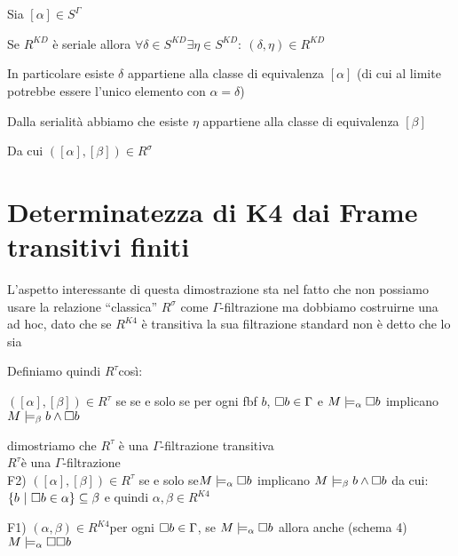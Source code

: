 \\
\\
Sia $[\alpha]\in S^{\Gamma}$

Se $R^{KD}$ è seriale allora $\forall\delta\in S^{KD}\exists\eta\in S^{KD}:\ (\delta,\eta)\in R^{KD}$

In particolare esiste $\delta$ appartiene alla classe di equivalenza
$[\alpha]$ (di cui al limite potrebbe essere l'unico elemento con
$\alpha=\delta$)

Dalla serialità abbiamo che esiste $\eta$ appartiene alla classe
di equivalenza $[\beta]$

Da cui $([\alpha],[\beta])\in R^{\sigma}$


\section{Determinatezza di K4 dai Frame transitivi finiti}

L'aspetto interessante di questa dimostrazione sta nel fatto che non
possiamo usare la relazione ``classica'' $R^{\sigma}$ come $\Gamma$-filtrazione
ma dobbiamo costruirne una ad hoc, dato che se $R^{K4}$ è transitiva
la sua filtrazione standard non è detto che lo sia

Definiamo quindi $R^{\tau}$così:

$([\alpha],[\beta])\in R^{\tau}$ se se e solo se per ogni fbf $b$,
$\square b\in\Gamma$ e $M\models_{\alpha}\square b$ implicano $M\models_{\beta}b\wedge\square b$

dimostriamo che $R^{\tau}$ è una $\Gamma$-filtrazione transitiva\\


$R^{\tau}$è una $\Gamma$-filtrazione\\


F2) $([\alpha],[\beta])\in R^{\tau}$ se e solo se$M\models_{\alpha}\square b$
implicano $M\models_{\beta}b\wedge\square b$ da cui: $\{b\ |\ \boxx{b\in\alpha\}\subseteq\beta}$
e quindi $\alpha,\beta\in R^{K4}$

F1) $(\alpha,\beta)\in R^{K4}$per ogni $\square b\in\Gamma$, se $M\models_{\alpha}\square b$
allora anche (schema 4) $M\models_{\alpha}\square\square b$ 

